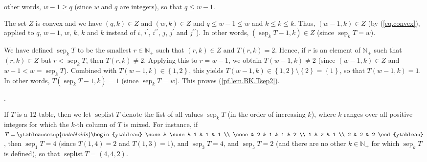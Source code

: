 \documentclass[numbers=enddot,12pt,final,onecolumn,notitlepage]{scrartcl}%
\theoremstyle{definition}
\newenvironment{verlong}{}{}
\begin{document}
\begin{verlong}
{other words, $w-1\geq q$ (since $w$ and $q$ are integers), so that $q\leq
w-1$.
\par
The set $Z$ is convex and we have $\left(  q,k\right)  \in Z$ and $\left(
w,k\right)  \in Z$ and $q\leq w-1\leq w$ and $k\leq k\leq k$. Thus, $\left(
w-1,k\right)  \in Z$ (by (\ref{eq.convex}), applied to $q$, $w-1$, $w$, $k$,
$k$ and $k$ instead of $i$, $i^{\prime}$, $i^{\prime\prime}$, $j$, $j^{\prime
}$ and $j^{\prime\prime}$). In other words, $\left(  \operatorname*{sep}%
\nolimits_{k}T-1,k\right)  \in Z$ (since $\operatorname*{sep}\nolimits_{k}%
T=w$).
\par
We have defined $\operatorname*{sep}\nolimits_{k}T$ to be the smallest
$r\in\mathbb{N}_{+}$ such that $\left(  r,k\right)  \in Z$ and $T\left(
r,k\right)  =2$. Hence, if $r$ is an element of $\mathbb{N}_{+}$ such that
$\left(  r,k\right)  \in Z$ but $r<\operatorname*{sep}\nolimits_{k}T$, then
$T\left(  r,k\right)  \neq2$. Applying this to $r=w-1$, we obtain $T\left(
w-1,k\right)  \neq2$ (since $\left(  w-1,k\right)  \in Z$ and
$w-1<w=\operatorname*{sep}\nolimits_{k}T$). Combined with $T\left(
w-1,k\right)  \in\left\{  1,2\right\}  $, this yields $T\left(  w-1,k\right)
\in\left\{  1,2\right\}  \setminus\left\{  2\right\}  =\left\{  1\right\}  $,
so that $T\left(  w-1,k\right)  =1$. In other words, $T\left(
\operatorname*{sep}\nolimits_{k}T-1,k\right)  =1$ (since $\operatorname*{sep}%
\nolimits_{k}T=w$). This proves (\ref{pf.lem.BK.Tsep2}).}.
\end{verlong}

If $T$ is a 12-table, then we let $\operatorname*{seplist}T$ denote the list
of all values $\operatorname*{sep}\nolimits_{k}T$ (in the order of increasing
$k$), where $k$ ranges over all positive integers for which the $k$-th column
of $T$ is mixed. For instance, if $T=%
\ytableausetup{notabloids}
\begin{ytableau}
\none& \none& 1 & 1 & 1 \\
\none& 2 & 1 & 1 & 2 \\
1 & 2 & 1 \\
2 & 2 & 2
\end{ytableau}%
$, then $\operatorname*{sep}\nolimits_{1}T=4$ (since $T\left(  1,4\right)  =2$
and $T\left(  1,3\right)  =1$), and $\operatorname*{sep}\nolimits_{3}T=4$, and
$\operatorname*{sep}\nolimits_{5}T=2$ (and there are no other $k\in
\mathbb{N}_{+}$ for which $\operatorname*{sep}\nolimits_{k}T$ is defined), so
that $\operatorname*{seplist}T=\left(  4,4,2\right)  $.
\end{document}
